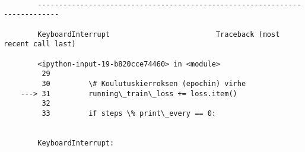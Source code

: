 \documentclass[11pt]{article}
\begin{document}
    \begin{Verbatim}[commandchars=\\\{\}]

        ---------------------------------------------------------------------------

        KeyboardInterrupt                         Traceback (most recent call last)

        <ipython-input-19-b820cce74460> in <module>
         29 
         30         \# Koulutuskierroksen (epochin) virhe
    ---> 31         running\_train\_loss += loss.item()
         32 
         33         if steps \% print\_every == 0:


        KeyboardInterrupt: 

    \end{Verbatim}
\end{document}
